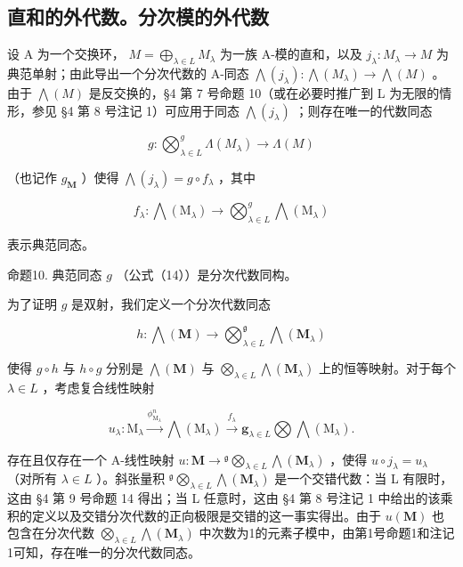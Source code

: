 \subsection{直和的外代数。分次模的外代数}

设 A 为一个交换环， \(M = \bigoplus_{\lambda \in L} M_{\lambda}\) 为一族 A-模的直和，以及 \(j_{\lambda}: M_{\lambda} \to M\) 为典范单射；由此导出一个分次代数的 A-同态 \(\bigwedge(j_{\lambda}): \bigwedge(M_{\lambda}) \to \bigwedge(M)\) 。由于 \(\bigwedge(M)\) 是反交换的，§4 第 7 号命题 10（或在必要时推广到 L 为无限的情形，参见 §4 第 8 号注记 1）可应用于同态 \(\bigwedge(j_{\lambda})\) ；则存在唯一的代数同态

\[
g \colon \bigotimes_ {\lambda \in L} ^ {g} \Lambda (M _ {\lambda}) \to \Lambda (M)\tag{14}
\]

（也记作 \(g_{\mathbf{M}}\) ）使得 \(\bigwedge (j_{\lambda}) = g \circ f_{\lambda}\) ，其中

\[
f _ {\lambda}: \bigwedge (\mathrm{M} _ {\lambda}) \rightarrow \bigotimes_ {\lambda \in L} ^ {g} \bigwedge (\mathrm{M} _ {\lambda})
\]

表示典范同态。

命题10. 典范同态 \(g\) （公式（14））是分次代数同构。

为了证明 \(g\) 是双射，我们定义一个分次代数同态

\[
h: \bigwedge (\mathbf {M}) \rightarrow \bigotimes_ {\lambda \in L} ^ {\mathfrak {g}} \bigwedge (\mathbf {M} _ {\lambda})\tag{15}
\]

使得 \(g \circ h\) 与 \(h \circ g\) 分别是 \(\bigwedge(\mathbf{M})\) 与 \(\bigotimes_{\lambda \in L} \bigwedge(\mathbf{M}_{\lambda})\) 上的恒等映射。对于每个 \(\lambda \in L\) ，考虑复合线性映射

\[
u _ {\lambda}: \mathrm{M} _ {\lambda} \xrightarrow {\phi_ {\mathrm{M} _ {\lambda}} ^ {n}} \bigwedge (\mathrm{M} _ {\lambda}) \xrightarrow {f _ {\lambda}} \mathbf {g} _ {\lambda \in L} \bigotimes \bigwedge (\mathrm{M} _ {\lambda}).
\]

存在且仅存在一个 A-线性映射 \(u: \mathbf{M} \to {}^{\mathfrak{g}} \bigotimes_{\lambda \in L} \bigwedge (\mathbf{M}_{\lambda})\) ，使得 \(u \circ j_{\lambda} = u_{\lambda}\) （对所有 \(\lambda \in L\) ）。斜张量积 \({}^{\mathfrak{g}} \bigotimes_{\lambda \in L} \bigwedge (\mathbf{M}_{\lambda})\) 是一个交错代数：当 L 有限时，这由 §4 第 9 号命题 14 得出；当 L 任意时，这由 §4 第 8 号注记 1 中给出的该乘积的定义以及交错分次代数的正向极限是交错的这一事实得出。由于 \(u(\mathbf{M})\) 也包含在分次代数 \(\bigotimes_{\lambda \in L} \bigwedge (\mathbf{M}_{\lambda})\) 中次数为1的元素子模中，由第1号命题1和注记1可知，存在唯一的分次代数同态。


